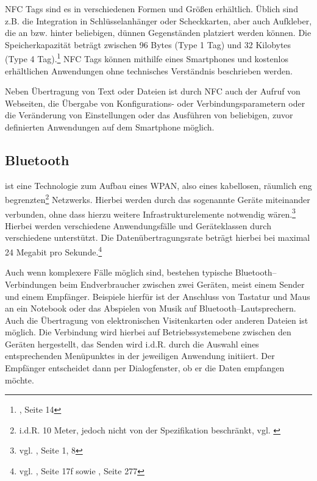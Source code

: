 NFC Tags sind es in verschiedenen Formen und Größen erhältlich. Üblich sind z.B. die Integration in Schlüsselanhänger oder Scheckkarten, aber auch Aufkleber, die an bzw. hinter beliebigen, dünnen Gegenständen platziert werden können. Die Speicherkapazität beträgt zwischen 96 Bytes (Type 1 Tag) und 32 Kilobytes (Type 4 Tag).\footnote{\cite{nfcforum:spec}, Seite 14} NFC Tags können mithilfe eines Smartphones und kostenlos erhältlichen Anwendungen ohne technisches Verständnis beschrieben werden.

Neben Übertragung von Text oder Dateien ist durch NFC auch der Aufruf von Webseiten, die Übergabe von Konfigurations- oder Verbindungsparametern oder die Veränderung von Einstellungen oder das Ausführen von beliebigen, zuvor definierten Anwendungen auf dem Smartphone möglich.


\subsection{Bluetooth} %
\label{sub:bluetooth}

 ist eine Technologie zum Aufbau eines \ac{WPAN}, also eines kabellosen, räumlich eng begrenzten\footnote{i.d.R. 10 Meter, jedoch nicht von der Spezifikation beschränkt, vgl. \cite{bluetooth:smart}} Netzwerks. Hierbei werden durch das sogenannte  Geräte miteinander verbunden, ohne dass hierzu weitere Infrastrukturelemente notwendig wären.\footnote{vgl. \cite{bluetooth:spec}, Seite 1, 8} Hierbei werden verschiedene Anwendungsfälle und Geräteklassen durch verschiedene  unterstützt.  Die Datenübertragungsrate beträgt hierbei bei maximal 24 Megabit pro Sekunde.\footnote{vgl. \cite{bluetooth:sigv1}, Seite 17f sowie \cite{bluetooth:sigv3}, Seite 277}

Auch wenn komplexere Fälle möglich sind, bestehen typische Bluetooth–Verbindungen beim Endverbraucher zwischen zwei Geräten, meist einem Sender und einem Empfänger. Beispiele hierfür ist der Anschluss von Tastatur und Maus an ein Notebook oder das Abspielen von Musik auf Bluetooth–Lautsprechern. Auch die Übertragung von elektronischen Visitenkarten oder anderen Dateien ist möglich. Die Verbindung wird hierbei auf Betriebssystemebene zwischen den Geräten hergestellt, das Senden wird i.d.R. durch die Auswahl eines entsprechenden Menüpunktes in der jeweiligen Anwendung initiiert. Der Empfänger entscheidet dann per Dialogfenster, ob er die Daten empfangen möchte.

